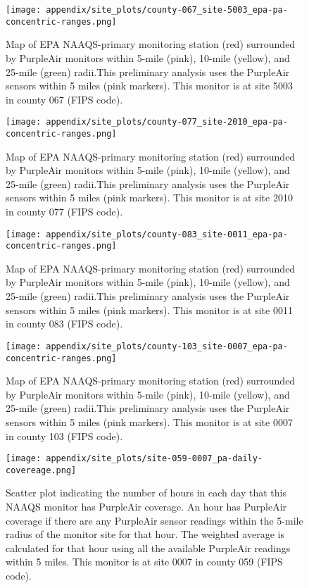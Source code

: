 \begin{figure}
\centering
\texttt{[image: appendix/site\_plots/county-067\_site-5003\_epa-pa-concentric-ranges.png]}
\caption{Map of EPA NAAQS-primary monitoring station (red) surrounded by PurpleAir monitors within 5-mile (pink), 10-mile (yellow), and 25-mile (green) radii.This preliminary analysis uses the PurpleAir sensors within 5 miles (pink markers). This monitor is at site 5003 in county 067 (FIPS code).}
\label{fig:concentric_purpleair_067-5003}
\end{figure}
\begin{figure}
\centering
\texttt{[image: appendix/site\_plots/county-077\_site-2010\_epa-pa-concentric-ranges.png]}
\caption{Map of EPA NAAQS-primary monitoring station (red) surrounded by PurpleAir monitors within 5-mile (pink), 10-mile (yellow), and 25-mile (green) radii.This preliminary analysis uses the PurpleAir sensors within 5 miles (pink markers). This monitor is at site 2010 in county 077 (FIPS code).}
\label{fig:concentric_purpleair_077-2010}
\end{figure}
\begin{figure}
\centering
\texttt{[image: appendix/site\_plots/county-083\_site-0011\_epa-pa-concentric-ranges.png]}
\caption{Map of EPA NAAQS-primary monitoring station (red) surrounded by PurpleAir monitors within 5-mile (pink), 10-mile (yellow), and 25-mile (green) radii.This preliminary analysis uses the PurpleAir sensors within 5 miles (pink markers). This monitor is at site 0011 in county 083 (FIPS code).}
\label{fig:concentric_purpleair_083-0011}
\end{figure}
\begin{figure}
\centering
\texttt{[image: appendix/site\_plots/county-103\_site-0007\_epa-pa-concentric-ranges.png]}
\caption{Map of EPA NAAQS-primary monitoring station (red) surrounded by PurpleAir monitors within 5-mile (pink), 10-mile (yellow), and 25-mile (green) radii.This preliminary analysis uses the PurpleAir sensors within 5 miles (pink markers). This monitor is at site 0007 in county 103 (FIPS code).}
\label{fig:concentric_purpleair_103-0007}
\end{figure}
\begin{figure}
\centering
\texttt{[image: appendix/site\_plots/site-059-0007\_pa-daily-covereage.png]}
\caption{Scatter plot indicating the number of hours in each day that this NAAQS monitor has PurpleAir coverage. An hour has PurpleAir coverage if there are any PurpleAir sensor readings within the 5-mile radius of the monitor site for that hour. The weighted average is calculated for that hour using all the available PurpleAir readings within 5 miles. This monitor is at site 0007 in county 059 (FIPS code).}
\label{fig:hourly_coverage_059-0007}
\end{figure}
